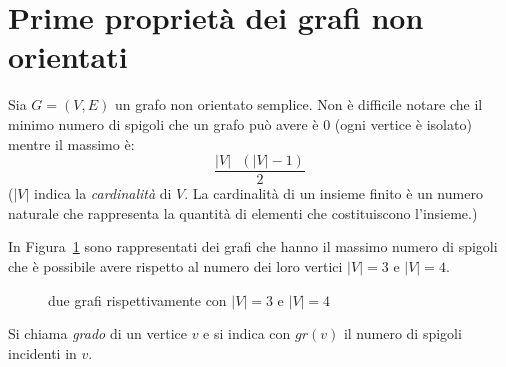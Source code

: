\section{Prime proprietà dei grafi non orientati}

Sia $G=(V,E)$ un grafo non orientato semplice.
Non è difficile notare che il minimo numero di spigoli che un grafo può avere è $0$ (ogni vertice è isolato) mentre il massimo è:
\[ \frac{|V|\text{ }(|V|-1)}{2} \]
($|V|$ indica la \emph{cardinalità} di $V$. La cardinalità di un insieme finito è un numero naturale che rappresenta la quantità di elementi che costituiscono l'insieme.)
\begin{ese} In Figura~\ref{fig:card} sono rappresentati dei grafi che hanno il massimo
numero di spigoli che è possibile avere rispetto al numero dei loro vertici $|V| = 3$ e $|V| = 4$.
\begin{figure}[H]		
    \centering
        \hspace{1cm}
        \caption{due grafi rispettivamente con $|V| = 3$ e $|V| = 4$} \label{fig:card}
    \end{figure}
\QEDA
\end{ese}

\begin{defn} Si chiama \emph{grado} di un vertice $v$ e si indica con $gr(v)$ il
numero di spigoli incidenti in $v$.
\end{defn}

